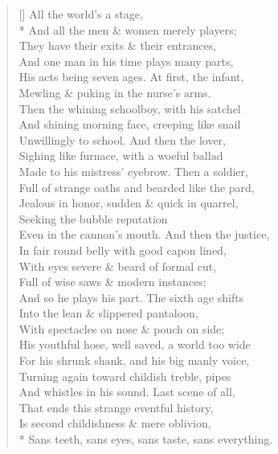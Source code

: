 \documentclass[MAIN]{subfiles}
\begin{document}
\settowidth{\versewidth}{Sans teeth, sans eyes, sans taste, sans everything.}
\begin{verse}[\versewidth]
\vin \vin \vin \vin \vin All the world's a stage,\\*
And all the men \& women merely players;\\
They have their exits \& their entrances,\\
And one man in his time plays many parts,\\
His acts being seven ages. At first, the infant,\\
Mewling \& puking in the nurse's arms.\\
Then the whining schoolboy, with his satchel\\
And shining morning face, creeping like snail\\
Unwillingly to school. And then the lover,\\
Sighing like furnace, with a woeful ballad\\
Made to his mistress' eyebrow. Then a soldier,\\
Full of strange oaths and bearded like the pard,\\
Jealous in honor, sudden \& quick in quarrel,\\
Seeking the bubble reputation\\
Even in the cannon's mouth. And then the justice,\\
In fair round belly with good capon lined,\\
With eyes severe \& beard of formal cut,\\
Full of wise saws \& modern instances;\\
And so he plays his part. The sixth age shifts\\
Into the lean \& slippered pantaloon,\\
With spectacles on nose \& pouch on side;\\
His youthful hose, well saved, a world too wide\\
For his shrunk shank, and his big manly voice,\\
Turning again toward childish treble, pipes\\
And whistles in his sound. Last scene of all,\\
That ends this strange eventful history,\\
Is second childishness \& mere oblivion,\\*
Sans teeth, sans eyes, sans taste, sans everything.
\end{verse}
\end{document}
